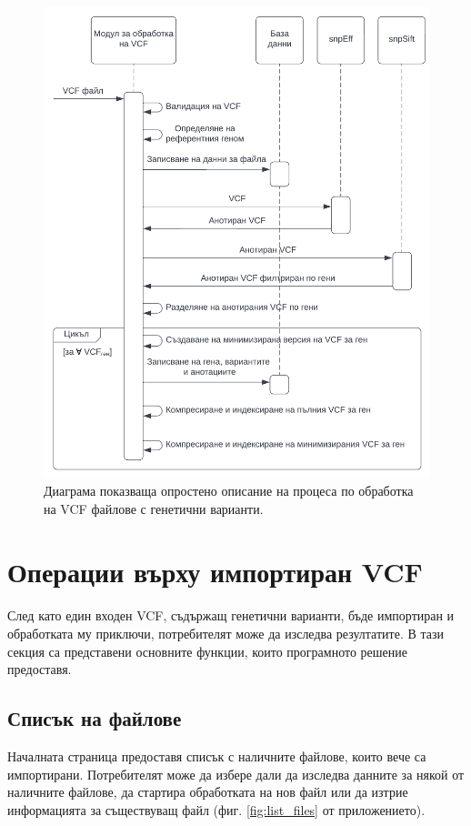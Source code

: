 \documentclass[pdftex,cyrillic,14pt,a4page,twoside,openright]{extreport}
\begin{document}
\begin{figure}[htp]
  \centering
  \includegraphics[width=16cm]{figures/vcf_processing_sequence}
  \caption {Диаграма показваща опростено описание на процеса по обработка на VCF файлове с генетични варианти.}
  \label{fig:vcf_processing_sequence}
\end{figure}

\section{Операции върху импортиран VCF}
\paragraph{}
След като един входен VCF, съдържащ генетични варианти, бъде импортиран и обработката му приключи, потребителят може да изследва резултатите. В тази секция са представени основните функции, които програмното решение предоставя.

\subsection{Списък на файлове}
Началната страница предоставя списък с наличните файлове, които вече са импортирани. Потребителят може да избере дали да изследва данните за някой от наличните файлове, да стартира обработката на нов файл или да изтрие информацията за съществуващ файл (фиг. \ref{fig:list_files} от приложението).
\end{document}
